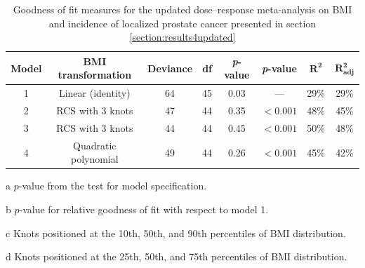 \bigskip

\begin{table}[hb]
\centering
\caption[Goodness of fit measures for the dose--response meta-analysis on BMI and localized prostate cancer incidence]{Goodness of fit measures for the updated dose--response meta-analysis on BMI and incidence of localized prostate cancer presented in section \ref{section:results4updated}}
\label{table:gof_table}
\begin{threeparttable}
\begin{tabular}{cccccccc}
\hline
\textbf{Model} & \textbf{BMI transformation} & \textbf{Deviance} & \textbf{df} & \textbf{\textit{p}-value}\tnote{a} & \textbf{\textit{p}-value}\tnote{b} & \textbf{$\mathbf{R^2}$} & \textbf{$\mathbf{R_{\textrm{adj}}^2}$} \\ \hline
1        & Linear (identity)                                                          & 64                & 45          & 0.03                      & ---                       & 29\%                    & 29\%                                   \\
2        & RCS with 3 knots\tnote{c}                                                                & 47                & 44          & 0.35                      & $<0.001$                  & 48\%                    & 45\%                                   \\
3        & RCS with 3 knots\tnote{d}                                                                & 44                & 44          & 0.45                      & $<0.001$                  & 50\%                    & 48\%                                   \\
4        & Quadratic polynomial                                                       & 49                & 44          & 0.26                      & $<0.001$                  & 45\%                    & 42\%                                   \\ \hline
\end{tabular}
\begin{tablenotes}
\item [a] \footnotesize $p$-value from the test for model specification.
\item [b] \footnotesize $p$-value for relative goodness of fit with respect to model 1.
\item [c] \footnotesize Knots positioned at the 10th, 50th, and 90th percentiles of BMI distribution.
\item [d] \footnotesize Knots positioned at the 25th, 50th, and 75th percentiles of BMI distribution.  
\end{tablenotes}
\end{threeparttable}
\end{table}





